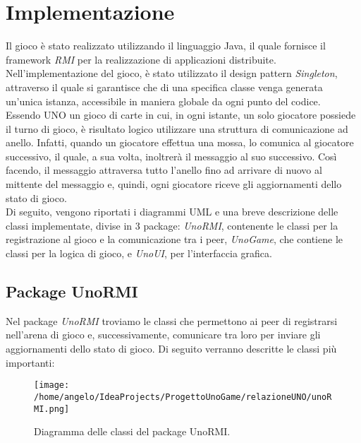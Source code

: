 \documentclass[11pt]{article} %
\begin{document}
\section{Implementazione}
Il gioco è stato realizzato utilizzando il linguaggio Java, il quale fornisce il framework \emph{RMI} per la realizzazione di applicazioni distribuite.
Nell'implementazione del gioco, è stato utilizzato il design pattern \emph{Singleton}, attraverso il quale si garantisce che di una specifica classe venga 
generata un'unica istanza, accessibile in maniera globale da ogni punto del codice.\\
Essendo UNO un gioco di carte in cui, in ogni istante, un solo giocatore possiede il turno di gioco, è risultato logico utilizzare una struttura di comunicazione
ad anello. Infatti, quando un giocatore effettua una mossa, lo comunica al giocatore successivo, il quale, a sua volta, inoltrerà il messaggio al suo successivo.
Così facendo, il messaggio attraversa tutto l'anello fino ad arrivare di nuovo al mittente del messaggio e, quindi, ogni giocatore riceve gli 
aggiornamenti dello stato di gioco.\\
Di seguito, vengono riportati i diagrammi UML e una breve descrizione delle classi implementate, divise in 3 package: \emph{UnoRMI}, contenente le classi per 
la registrazione al gioco e la comunicazione tra i peer, \emph{UnoGame}, che contiene le classi per la logica di gioco, e \emph{UnoUI}, per l'interfaccia 
grafica.

\subsection{Package UnoRMI}
Nel package \emph{UnoRMI} troviamo le classi che permettono ai peer di registrarsi nell'arena di gioco e, successivamente, comunicare tra loro per inviare 
gli aggiornamenti dello stato di gioco. Di seguito verranno descritte le classi più importanti:
\begin{figure}[h]
\centering%
\texttt{[image: /home/angelo/IdeaProjects/ProgettoUnoGame/relazioneUNO/unoRMI.png]}%
\caption{Diagramma delle classi del package UnoRMI.}
\end{figure}
\end{document}
